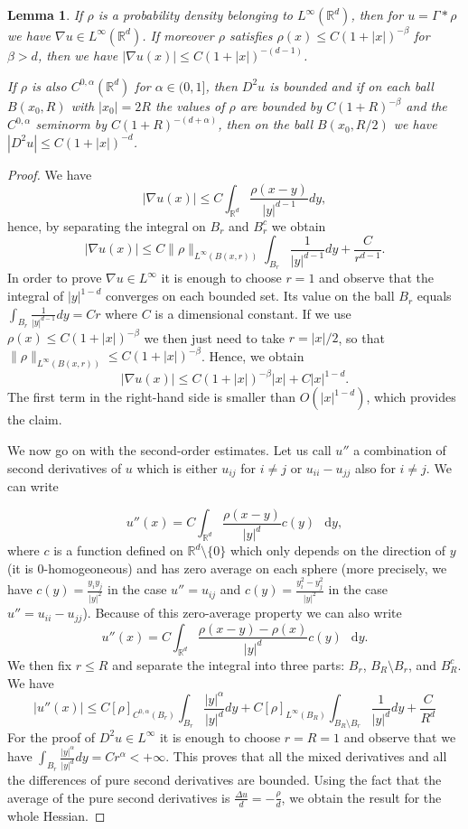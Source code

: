 \documentclass[11pt,a4paper]{article}
\numberwithin{equation}{section}
\newcommand{\R}{{\mathbb{R}}}
\theoremstyle{plain}
\newtheorem{lemma}[theorem]{Lemma}
\theoremstyle{remark}
\newcommand{\diff}{\mathop{}\!\mathrm{d}}
\begin{document}
\begin{lemma}\label{boundsDuDDu}
If $\rho$ is a probability density belonging to $L^\infty(\R^d)$, then for $u=\Gamma*\rho$ we have $\nabla u\in L^\infty(\R^d)$. If moreover $\rho$ satisfies $\rho(x)\leq C(1+|x|)^{-\beta}$ for $\beta>d$, then we have $|\nabla u(x)|\leq C(1+|x|)^{-(d-1)}$.

If $\rho$ is also $C^{0,\alpha}(\R^d)$ for $\alpha\in(0,1]$, then $D^2u $ is bounded and if on each ball $B(x_0,R)$ with $|x_0| = 2R$ the values of $\rho$ are bounded by $C(1+R)^{-\beta}$ and the $C^{0,\alpha}$ seminorm by $C(1+R)^{-(d+\alpha)}$, then on the ball $B(x_0,R/2)$ we have $|D^2u|\leq C(1+|x|)^{-d}$.
\end{lemma}
\begin{proof}
We have
$$
    |\nabla u(x)|\leq C\int_{\R^d}\frac{\rho(x-y)}{|y|^{d-1}}dy,
$$
hence, by separating the integral on $B_r$ and $B_r^c$ we obtain
$$
    |\nabla u(x)|\leq C\|\rho\|_{L^\infty(B(x,r))}\int_{B_r}\frac{1}{|y|^{d-1}}dy+\frac{C}{r^{d-1}}.
$$
In order to prove $\nabla u\in L^\infty$ it is enough to choose $r=1$ and observe that the integral of $|y|^{1-d}$ converges on each bounded set.  Its value on the ball $B_r$ equals $\int_{B_r}\frac{1}{|y|^{d-1}}dy=Cr$ where $C$ is a dimensional constant. If we use $\rho(x)\leq C(1+|x|)^{-\beta}$ we then just need to take $r=|x|/2$, so that $ \|\rho\|_{L^\infty(B(x,r))} \leq C(1+|x|)^{-\beta}$. Hence, we obtain
$$|\nabla u(x)|\leq C(1+|x|)^{-\beta}|x|+C|x|^{1-d}.$$
The first term in the right-hand side is smaller than $O(|x|^{1-d})$, which provides the claim.

We now go on with the second-order estimates. Let us call $u''$ a combination of second derivatives of $u$ which is either $u_{ij}$ for $i\neq j$ or $u_{ii}-u_{jj}$ also for $i\neq j$. We can write

\[
u''(x) 
  = 
C \int_{\R^d} \frac{\rho(x-y)}{| y|^d}c(y)\,\diff y,
\]
where $c$ is a function defined on $\R^d\setminus\{0\}$ which only depends on the direction of $y$ (it is $0$-homogeoneous) and has zero average on each sphere (more precisely, we have $c(y)=\frac{y_iy_j}{|y|^2}$ in the case $u''= u_{ij}$ and $c(y)=\frac{y_i^2-y_j^2}{|y|^2}$ in the case $u''=u_{ii}-u_{jj}$). Because of this zero-average property we can also write
\[
u''(x) 
  = 
C \int_{\R^d} \frac{\rho(x-y)-\rho(x)}{| y|^d}c(y)\,\diff y.
\]
We then fix $r\leq R$ and separate the integral into three parts: $B_r$, $B_R\setminus B_r$, and $B_R^c$. We have
\[
|u''(x)|\leq C[\rho]_{C^{0,\alpha}(B_r)}\int_{B_r}\frac{|y|^\alpha}{|y|^d}dy+ C[\rho]_{L^\infty(B_R)}\int_{B_R\setminus B_r}\frac{1}{|y|^d}dy+\frac{C}{R^d}
\]
For the proof of $D^2u\in L^\infty$ it is enough to choose $r=R=1$ and observe that we have $\int_{B_r}\frac{|y|^\alpha}{|y|^d}dy=Cr^\alpha<+\infty$. This proves that all the mixed derivatives and all the differences of pure second derivatives are bounded. Using the fact that the average of the pure second derivatives is $\frac{\Delta u}{d}=-\frac{\rho}{d}$, we obtain the result for the whole Hessian. 


\end{proof}
\end{document}
